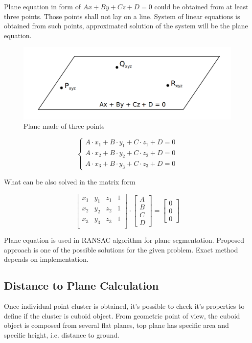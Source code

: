 \documentclass{ctuthesis}
\begin{document}
Plane equation in form of $Ax + By + Cz + D = 0$ could be obtained from at least three points. Those points shall not lay on a line. System of linear equations is obtained from such points, approximated solution of the system will be the plane equation.

\begin{figure}[htbp]
    \centering
    \includegraphics[width=\textwidth]{plane_eq.png}
    \caption{Plane made of three points}
    \label{fig:plane_eq}
\end{figure}

\[
\begin{cases} A \cdot x_1 + B \cdot y_1 + C \cdot z_1  + D = 0 \\ A \cdot x_2 + B \cdot y_2 + C \cdot z_2  + D = 0 \\ A \cdot x_3 + B \cdot y_3 + C \cdot z_3  + D = 0 \end{cases}
\]

What can be also solved in the matrix form

\[\begin{bmatrix}
x_1 & y_1 & z_1 & 1\\
x_2 & y_2 & z_2 & 1\\
x_3 & y_3 & z_3 & 1\\
\end{bmatrix} \cdot \begin{bmatrix}
A\\
B\\
C\\
D
\end{bmatrix} = \begin{bmatrix}
0\\
0\\
0
\end{bmatrix}\]

Plane equation is used in RANSAC algorithm for plane segmentation. Proposed approach is one of the possible solutions for the given problem. Exact method depends on implementation.

\subsection{Distance to Plane Calculation}
Once individual point cluster is obtained, it's possible to check it's properties to define if the cluster is cuboid object. From geometric point of view, the cuboid object is composed from several flat planes, top plane has specific area and specific height, i.e. distance to ground.
\end{document}
